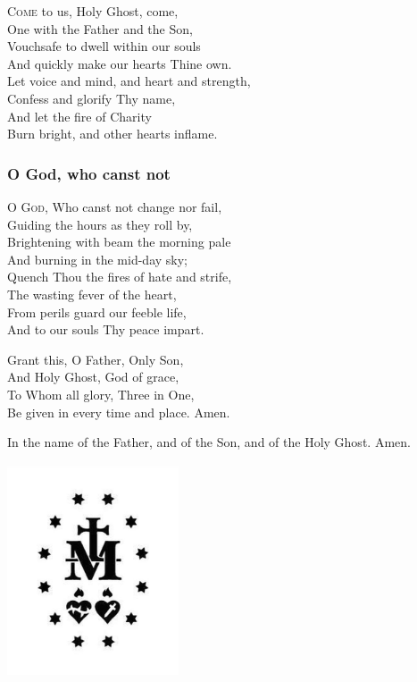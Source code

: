 \documentclass{article}
\begin{document}
\begin{multicols}{3}
\textsc{Come} to us, Holy Ghost, come,\\
One with the Father and the Son,\\
Vouchsafe to dwell within our souls\\
And quickly make our hearts Thine own.\\
Let voice and mind, and heart and strength,\\
Confess and glorify Thy name,\\
And let the fire of Charity\\
Burn bright, and other hearts inflame.

\subsubsection*{O God, who canst not}

\textsc{O God}, Who canst not change nor fail,\\
Guiding the hours as they roll by,\\
Brightening with beam the morning pale\\
And burning in the mid-day sky;\\
Quench Thou the fires of hate and strife,\\
The wasting fever of the heart,\\
From perils guard our feeble life,\\
And to our souls Thy peace impart.

Grant this, O Father, Only Son,\\
And Holy Ghost, God of grace,\\
To Whom all glory, Three in One,\\
Be given in every time and place. Amen.

In the name of the Father, and of the Son, and of the Holy Ghost.  Amen.

\end{multicols}

  \vfill
  \begin{center}    
      \includegraphics [width=2in] {512px-Miraculous_medal_reverse_symbols.jpg}
  \end{center}
  \vfill
  
\end{document}
